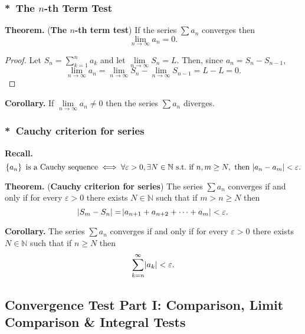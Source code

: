 \documentclass[12pt,a4paper]{article}
\begin{document}
\subsubsection*{*\ The $n$-th Term Test}
\begin{tcolorbox}[colback=white]
	\textbf{Theorem.} (\textbf{The $n$-th term test}) If the series $\sum a_n$ converges then \[
	\lim\limits_{n\to\infty}a_n=0.
	\]\tcblower\begin{proof}
		Let $S_n=\sum_{k=1}^na_k$ and let $\lim\limits_{n\to\infty}S_n=L$. Then, since $a_n=S_n-S_{n-1}$, \[
		\lim\limits_{n\to\infty}a_n = \lim\limits_{n\to\infty}S_n-\lim\limits_{n\to\infty}S_{n-1}=L-L=0.
		\]
	\end{proof}
\end{tcolorbox}
\begin{tcolorbox}[colback=white]
	\textbf{Corollary.} If $\lim\limits_{n\to\infty}a_n\neq 0$ then the series $\sum a_n$ diverges.
\end{tcolorbox}

\subsubsection*{*\ Cauchy criterion for series}
\textbf{Recall.} \[
\set{a_n}\ \text{is a Cauchy sequence}\iff\forall\varepsilon>0, \exists N\in\mathbb{N}\ \text{s.t.}\ \text{if}\ n,m\geq N,\ \text{then}\ \abs{a_n-a_m}<\varepsilon.
\]
\begin{tcolorbox}[colback=white]
	\textbf{Theorem.} (\textbf{Cauchy criterion for series}) The series $\sum a_n$ converges if and only if for every $\varepsilon>0$ there exists $N\in\mathbb{N}$ such that if $m>n\geq N$ then \[
	\abs{S_m-S_n}=\abs{a_{n+1}+a_{n+2}+\cdots+a_m}<\varepsilon.
	\]
\end{tcolorbox}
\begin{tcolorbox}[colback=white]
	\textbf{Corollary.} The series $\sum a_n$ converges if and only if for every $\varepsilon>0$ there exists $N\in\mathbb{N}$ such that if $n\geq N$ then \[
	\sum_{k=n}^\infty\abs{a_k}<\varepsilon.
	\]
\end{tcolorbox}

\subsection{Convergence Test Part I: Comparison, Limit Comparison \& Integral Tests}
\end{document}

